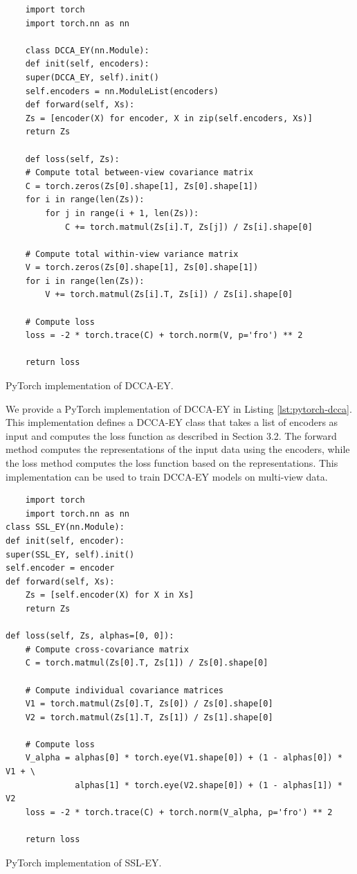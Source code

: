 \begin{listing}[ht]
    \begin{verbatim}
    import torch
    import torch.nn as nn
    
    class DCCA_EY(nn.Module):
    def init(self, encoders):
    super(DCCA_EY, self).init()
    self.encoders = nn.ModuleList(encoders)
    def forward(self, Xs):
    Zs = [encoder(X) for encoder, X in zip(self.encoders, Xs)]
    return Zs

    def loss(self, Zs):
    # Compute total between-view covariance matrix
    C = torch.zeros(Zs[0].shape[1], Zs[0].shape[1])
    for i in range(len(Zs)):
        for j in range(i + 1, len(Zs)):
            C += torch.matmul(Zs[i].T, Zs[j]) / Zs[i].shape[0]
    
    # Compute total within-view variance matrix
    V = torch.zeros(Zs[0].shape[1], Zs[0].shape[1])
    for i in range(len(Zs)):
        V += torch.matmul(Zs[i].T, Zs[i]) / Zs[i].shape[0]
    
    # Compute loss
    loss = -2 * torch.trace(C) + torch.norm(V, p='fro') ** 2
    
    return loss
    \end{verbatim}
    \caption{PyTorch implementation of DCCA-EY.}    
    \label{lst:pytorch-dcca}
\end{listing}

We provide a PyTorch implementation of DCCA-EY in Listing \ref{lst:pytorch-dcca}. This implementation defines a DCCA-EY class that takes a list of encoders as input and computes the loss function as described in Section 3.2. The forward method computes the representations of the input data using the encoders, while the loss method computes the loss function based on the representations. This implementation can be used to train DCCA-EY models on multi-view data.

\begin{listing}[ht]
    \begin{verbatim}
    import torch
    import torch.nn as nn
class SSL_EY(nn.Module):
def init(self, encoder):
super(SSL_EY, self).init()
self.encoder = encoder
def forward(self, Xs):
    Zs = [self.encoder(X) for X in Xs]
    return Zs

def loss(self, Zs, alphas=[0, 0]):
    # Compute cross-covariance matrix
    C = torch.matmul(Zs[0].T, Zs[1]) / Zs[0].shape[0]
    
    # Compute individual covariance matrices
    V1 = torch.matmul(Zs[0].T, Zs[0]) / Zs[0].shape[0]
    V2 = torch.matmul(Zs[1].T, Zs[1]) / Zs[1].shape[0]
    
    # Compute loss
    V_alpha = alphas[0] * torch.eye(V1.shape[0]) + (1 - alphas[0]) * V1 + \
              alphas[1] * torch.eye(V2.shape[0]) + (1 - alphas[1]) * V2
    loss = -2 * torch.trace(C) + torch.norm(V_alpha, p='fro') ** 2
    
    return loss
    \end{verbatim}
    \caption{PyTorch implementation of SSL-EY.}
    \label{lst:pytorch-ssl}
\end{listing}



